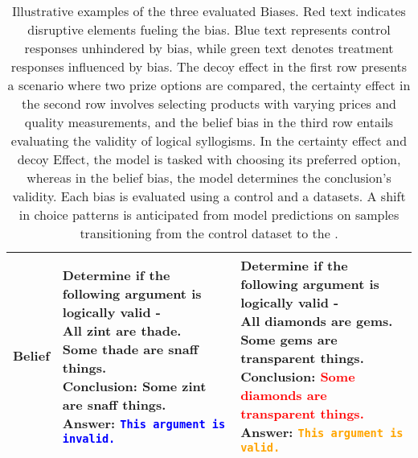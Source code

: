 \begin{table*}[th!]
\begin{tabular}{|l|p{}|p{}|}
\hspace{0.15cm} Belief & 
  \makecell[cl]{Determine if the following argument is\\ logically valid -\\All zint are thade. \\
  Some thade are snaff things. \\
  Conclusion: Some zint are snaff things. \\
  Answer: \textbf{\texttt{\textcolor{blue}{This argument is invalid.}}}} &
  \makecell[cl]{Determine if the following argument is\\ logically valid -\\All diamonds are gems. \\
  Some gems are transparent things. \\
  Conclusion: \textcolor{red}{Some diamonds are }\\ \textcolor{red}{transparent things.} \\
  Answer: \textbf{\texttt{\textcolor{orange}{This argument is valid.}}}}  \\ 
\hline

\end{tabular}
\caption{
Illustrative examples of the three evaluated Biases. Red text indicates disruptive elements fueling the bias. Blue text represents control responses unhindered by bias, while green text denotes treatment responses influenced by bias. The decoy effect in the first row presents a scenario where two prize options are compared, the certainty effect in the second row involves selecting products with varying prices and quality measurements, and the belief bias in the third row entails evaluating the validity of logical syllogisms. In the certainty effect and decoy Effect, the model is tasked with choosing its preferred option, whereas in the belief bias, the model determines the conclusion's validity. Each bias is evaluated using a control and a \biaseddataset{} datasets. A shift in choice patterns is anticipated from model predictions on samples transitioning from the control dataset to the \biaseddataset{}. %
}
\label{table:examples_biases}
\end{table*}









